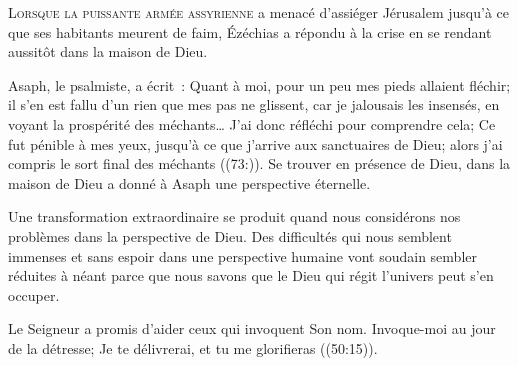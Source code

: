 




\lettrine{L}{orsque la puissante armée assyrienne} a menacé d'assiéger
 Jérusalem jusqu'à ce que ses habitants meurent de faim,
 Ézéchias a répondu à la crise en se rendant aussitôt
 dans la maison de Dieu. 


Asaph, le psalmiste, a écrit~: 
 \og Quant à moi, pour un peu mes pieds allaient fléchir;
 il s’en est fallu d’un rien que mes pas ne glissent,
 car je jalousais les insensés, en voyant la prospérité des méchants\dots{}
 J’ai donc réfléchi pour comprendre cela; Ce fut pénible à mes yeux,
 jusqu’à ce que j’arrive aux sanctuaires de Dieu;
 alors j’ai compris le sort final des méchants \fg{} ((73:)).
 Se trouver en présence de Dieu, dans la maison de Dieu
 a donné à Asaph une perspective éternelle. 

Une transformation extraordinaire se produit quand nous considérons
 nos problèmes dans la perspective de Dieu.
 Des difficultés qui nous semblent immenses et sans espoir
 dans une perspective humaine vont soudain sembler réduites à néant
 \ocadr parce que nous savons que le Dieu qui régit l'univers
 peut s'en occuper. 

Le Seigneur a promis d'aider ceux qui invoquent Son nom.
 \og Invoque-moi au jour de la détresse; Je te délivrerai,
 et tu me glorifieras \fg{} ((50:15)).

\dvrule







